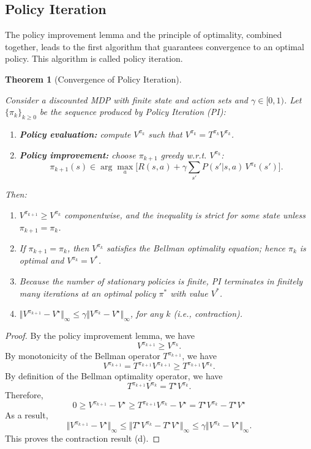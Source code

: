 \documentclass[
]{book}
\providecommand{\tightlist}{%
  \setlength{\itemsep}{0pt}\setlength{\parskip}{0pt}}
\newtheorem{theorem}{Theorem}[chapter]
\theoremstyle{definition}
\theoremstyle{definition}
\theoremstyle{definition}
\theoremstyle{definition}
\theoremstyle{remark}
\begin{document}
\subsection{Policy Iteration}\label{policy-iteration}

The policy improvement lemma and the principle of optimality, combined together, leads to the first algorithm that guarantees convergence to an optimal policy. This algorithm is called policy iteration.

\begin{theorem}[Convergence of Policy Iteration]
\protect\hypertarget{thm:PolicyIterationConvergence}{}\label{thm:PolicyIterationConvergence}

Consider a discounted MDP with finite state and action sets and \(\gamma\in[0,1)\). Let \(\{\pi_k\}_{k\ge0}\) be the sequence produced by \emph{Policy Iteration (PI)}:

\begin{enumerate}
\def\labelenumi{\arabic{enumi}.}
\tightlist
\item
  \textbf{Policy evaluation:} compute \(V^{\pi_k}\) such that \(V^{\pi_k}=T^{\pi_k}V^{\pi_k}\).
\item
  \textbf{Policy improvement:} choose \(\pi_{k+1}\) greedy w.r.t. \(V^{\pi_k}\):
  \[
  \pi_{k+1}(s) \in \arg\max_{a}\Big[ R(s,a)+\gamma\sum_{s'}P(s'|s,a)\,V^{\pi_k}(s')\Big].
  \]
\end{enumerate}

Then:

\begin{enumerate}
\def\labelenumi{\alph{enumi}.}
\item
  \(V^{\pi_{k+1}} \ge V^{\pi_k}\) componentwise, and the inequality is strict for some state unless \(\pi_{k+1}=\pi_k\).
\item
  If \(\pi_{k+1}=\pi_k\), then \(V^{\pi_k}\) satisfies the Bellman optimality equation; hence \(\pi_k\) is optimal and \(V^{\pi_k}=V^*\).
\item
  Because the number of stationary policies is finite, PI terminates in finitely many iterations at an optimal policy \(\pi^*\) with value \(V^*\).
\item
  \(\Vert V^{\pi_{k+1}} - V^\star \Vert_{\infty} \leq \gamma \Vert V^{\pi_k} -  V^\star \Vert_{\infty}\), for any \(k\) (i.e., contraction).
\end{enumerate}

\end{theorem}

\begin{proof}
By the policy improvement lemma, we have
\[
V^{\pi_{k+1}} \geq V^{\pi_k}.
\]
By monotonicity of the Bellman operator \(T^{\pi_{k+1}}\), we have
\[
V^{\pi_{k+1}} = T^{\pi_{k+1}} V^{\pi_{k+1}} \geq  T^{\pi_{k+1}} V^{\pi_k}.
\]
By definition of the Bellman optimality operator, we have
\[
T^{\pi_{k+1}} V^{\pi_k} = T^\star V^{\pi_k}.
\]
Therefore,
\[
0 \geq V^{\pi_{k+1}} - V^\star \geq T^{\pi_{k+1}} V^{\pi_k} - V^\star = T^\star V^{\pi_k} - T^\star V^\star
\]
As a result,
\[
\Vert V^{\pi_{k+1}} - V^\star \Vert_{\infty} \leq \Vert T^\star V^{\pi_k} - T^\star V^\star \Vert_{\infty} \leq \gamma \Vert V^{\pi_k} -  V^\star \Vert_{\infty}.
\]
This proves the contraction result (d).
\end{proof}
\end{document}
